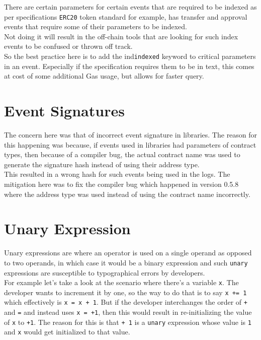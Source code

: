 There are certain parameters for certain events that are required to be indexed as per specifications \texttt{ERC20} token standard for example, has transfer and approval events that require some of their parameters to be indexed. \\

Not doing it will result in the off-chain tools that are looking for such index events to be confused or thrown off track. \\

So the best practice here is to add the ind\texttt{indexed} keyword to critical parameters in an event. Especially if the specification requires them to be in text, this comes at cost of some additional Gas usage, but allows for faster query.

\section{Event Signatures}

The concern here was that of incorrect event signature in libraries. The reason for this happening was because, if events used in libraries had parameters of contract types, then because of a compiler bug, the actual contract name was used to generate the signature hash instead of using their address type.\\

This resulted in a wrong hash for such events being used in the logs. The mitigation here was to fix the compiler bug which happened in version 0.5.8 where the address type was used instead of using the contract name incorrectly.

\section{Unary Expression}

Unary expressions are where an operator is used on a single operand as opposed to two operands, in which case it would be a binary expression and such \texttt{unary} expressions are susceptible to typographical errors by developers.\\

For example let's take a look at the scenario where there's a variable \texttt{x}. The developer wants to increment it by one, so the way to do that is to say \texttt{x += 1} which effectively is \texttt{x = x  + 1}. But if the developer interchanges the order of \texttt{+} and \texttt{=} and instead uses \texttt{x = +1}, then this would result in re-initializing the value of \texttt{x} to \texttt{+1}. The reason for this is that \texttt{+ 1} is a \texttt{unary} expression whose value is \texttt{1} and \texttt{x} would get initialized to that value.\\

